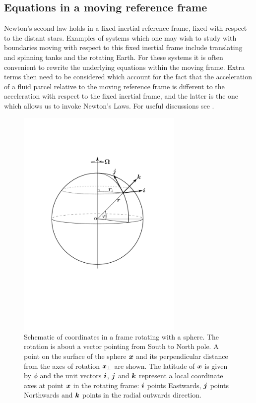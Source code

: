 \subsection{Equations in a moving reference frame}\label{sect:coriolis}
Newton's second law holds in a fixed inertial reference frame, \ie
fixed with respect to the distant stars. 
Examples of systems which one may wish to study with boundaries moving
with respect to this fixed inertial frame include translating and spinning tanks
and the rotating Earth. For these systems it is often convenient to rewrite the 
underlying equations within the moving frame. Extra terms then need to be considered 
which account for the fact that the acceleration of a fluid parcel relative to the 
moving reference frame is different to the acceleration with respect to the fixed 
inertial frame, and the latter is the one which allows us to invoke Newton's Laws.
For useful discussions see \citep{batchelor1967,cushman1994,knauss,vallis2006,gill1982}.

\begin{figure}\label{fig:rotating_frame}
\centering
\includegraphics[width=8.0cm]{misc_images/coordinates.pdf}
\caption{Schematic of coordinates in a frame rotating with a sphere. The rotation is about a vector
pointing from South to North pole. A point on the surface of the sphere ${\mbox{\boldmath$x$}}$ and its perpendicular
distance from the axes of rotation ${\mbox{\boldmath$x$}}_{\perp}$ are shown. The latitude of ${\mbox{\boldmath$x$}}$ is given by $\phi$ 
and the unit vectors ${\mbox{\boldmath$i$}}$, ${\mbox{\boldmath$j$}}$ and ${\mbox{\boldmath$k$}}$ represent a local coordinate axes at point ${\mbox{\boldmath$x$}}$ in the rotating
frame: ${\mbox{\boldmath$i$}}$ points Eastwards, ${\mbox{\boldmath$j$}}$ points Northwards and ${\mbox{\boldmath$k$}}$ points in the radial outwards direction.}
\end{figure}

